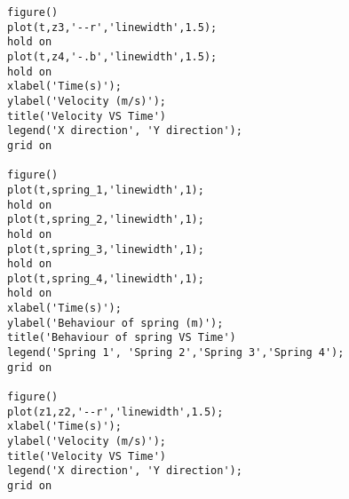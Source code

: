 \begin{framed}
\begin{verbatim}
figure()
plot(t,z3,'--r','linewidth',1.5);
hold on
plot(t,z4,'-.b','linewidth',1.5);
hold on
xlabel('Time(s)');
ylabel('Velocity (m/s)');
title('Velocity VS Time')
legend('X direction', 'Y direction');
grid on

figure()
plot(t,spring_1,'linewidth',1);
hold on
plot(t,spring_2,'linewidth',1);
hold on
plot(t,spring_3,'linewidth',1);
hold on
plot(t,spring_4,'linewidth',1);
hold on
xlabel('Time(s)');
ylabel('Behaviour of spring (m)');
title('Behaviour of spring VS Time')
legend('Spring 1', 'Spring 2','Spring 3','Spring 4');
grid on

figure()
plot(z1,z2,'--r','linewidth',1.5);
xlabel('Time(s)');
ylabel('Velocity (m/s)');
title('Velocity VS Time')
legend('X direction', 'Y direction');
grid on

\end{verbatim}
\end{framed}

